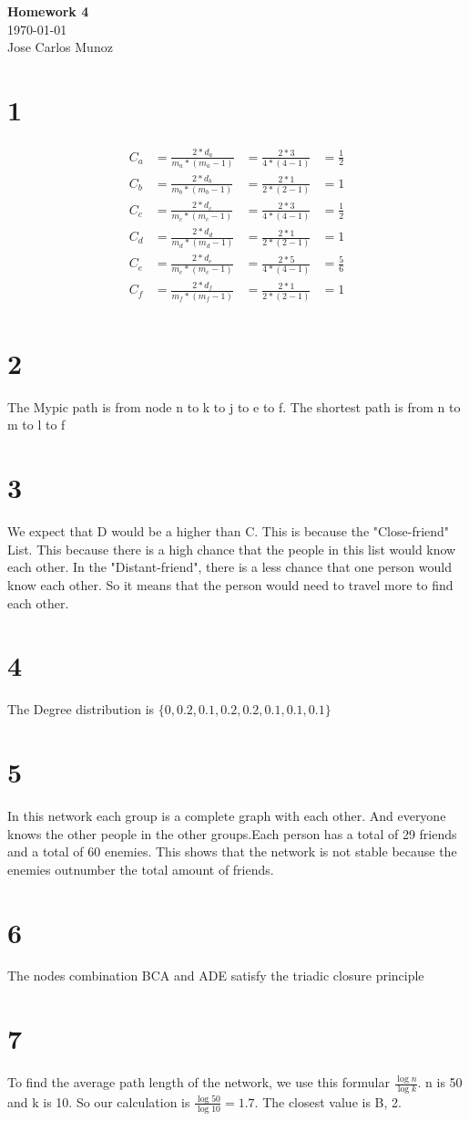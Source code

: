 \documentclass[12pt,english]{article}
\begin{document}
\begin{center}
    \Large
    \textbf{Homework 4}\\
    \small
    \today\\
    \large
    Jose Carlos Munoz
\end{center}
\section*{1}
\begin{align*}
C_a &= \frac{2 * d_a}{m_a * (m_a -1)} &= \frac{2 *3}{4 * (4-1)} &= \frac{1}{2}\\
C_b &= \frac{2 * d_b}{m_b * (m_b -1)} &= \frac{2 *1}{2 * (2-1)} &= 1\\
C_c &= \frac{2 * d_c}{m_c * (m_c -1)} &= \frac{2 *3}{4 * (4-1)} &=  \frac{1}{2}\\
C_d &= \frac{2 * d_d}{m_d * (m_d -1)} &= \frac{2 *1}{2 * (2-1)} &= 1\\
C_e &= \frac{2 * d_e}{m_e * (m_e -1)} &= \frac{2 *5}{4 * (4-1)} &=  \frac{5}{6}\\
C_f &= \frac{2 * d_f}{m_f * (m_f -1)} &= \frac{2 *1}{2 * (2-1)} &= 1\\
\end{align*}
\section*{2}
The Mypic path is from node n to k to j to e to f. The shortest path is from n to m to l to f
\section*{3}
We expect that D would be a higher than C. This is because the "Close-friend" List. This because there is a high chance that the people in this list would know each other. In the "Distant-friend", there is a less chance that one person would know each other. So it means that the person would need to travel more to find each other.
\section*{4}
The Degree distribution is $\{0, 0.2, 0.1, 0.2 , 0.2, 0.1, 0.1, 0.1\}$
\section*{5}
In this network each group is a complete graph with each other. And everyone knows the other people in the other groups.Each person has a total of 29 friends and a total of 60 enemies. This shows that the network is not stable because the enemies outnumber the total amount of friends.
\section*{6}
The nodes combination BCA and ADE satisfy the triadic closure principle
\section*{7}
To find the average path length of the network, we use this formular $\frac{\log n}{\log k}$. n is 50 and k is 10. So our calculation is $\frac{\log 50}{\log 10} = 1.7$. The closest value is B, 2.
\end{document}
